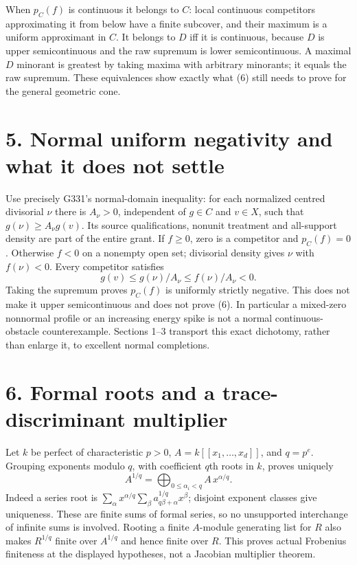 \documentclass[11pt]{article}
\begin{document}
When $p_C(f)$ is continuous it belongs to $C$: local continuous competitors approximating it from below have a finite subcover, and their maximum is a uniform approximant in $C$. It belongs to $D$ iff it is continuous, because $D$ is upper semicontinuous and the raw supremum is lower semicontinuous. A maximal $D$ minorant is greatest by taking maxima with arbitrary minorants; it equals the raw supremum. These equivalences show exactly what (6) still needs to prove for the general geometric cone.

\section{5. Normal uniform negativity and what it does not settle}

Use precisely G331's normal-domain inequality: for each normalized centred divisorial $\nu$ there is $A_\nu>0$, independent of $g\in C$ and $v\in X$, such that $g(\nu)\ge A_\nu g(v)$. Its source qualifications, nonunit treatment and all-support density are part of the entire grant. If $f\ge0$, zero is a competitor and $p_C(f)=0$. Otherwise $f<0$ on a nonempty open set; divisorial density gives $\nu$ with $f(\nu)<0$. Every competitor satisfies
\[
 g(v)\le g(\nu)/A_\nu\le f(\nu)/A_\nu<0.
\]
Taking the supremum proves $p_C(f)$ is uniformly strictly negative. This does not make it upper semicontinuous and does not prove (6). In particular a mixed-zero nonnormal profile or an increasing energy spike is not a normal continuous-obstacle counterexample. Sections 1--3 transport this exact dichotomy, rather than enlarge it, to excellent normal completions.

\section{6. Formal roots and a trace-discriminant multiplier}

Let $k$ be perfect of characteristic $p>0$, $A=k[[x_1,\ldots,x_d]]$, and $q=p^e$. Grouping exponents modulo $q$, with coefficient $q$th roots in $k$, proves uniquely
\[
 A^{1/q}=\bigoplus_{0\le\alpha_i<q} A\,x^{\alpha/q}. \tag{7}
\]
Indeed a series root is $\sum_\alpha x^{\alpha/q}\sum_\beta a_{q\beta+\alpha}^{1/q}x^\beta$; disjoint exponent classes give uniqueness. These are finite sums of formal series, so no unsupported interchange of infinite sums is involved. Rooting a finite $A$-module generating list for $R$ also makes $R^{1/q}$ finite over $A^{1/q}$ and hence finite over $R$. This proves actual Frobenius finiteness at the displayed hypotheses, not a Jacobian multiplier theorem.
\end{document}
